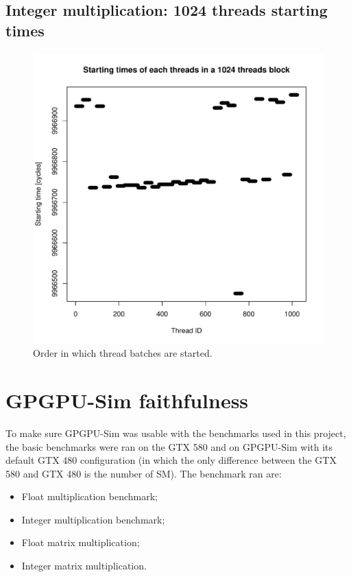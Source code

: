 \documentclass{report}
\def \scalingfactor{.8}
\begin{document}
    \section{Integer multiplication: 1024 threads starting times}
    \begin{figure}[H]
    		\centering
	    	\includegraphics[width=\scalingfactor\linewidth]{"graphics/starting_times_ratio31"}
	    	\vspace{-15pt}
	    	\captionsetup{justification=centering}    
	    	\caption{Order in which thread batches are started.}
    \end{figure}

\chapter{GPGPU-Sim faithfulness}
    To make sure GPGPU-Sim was usable with the benchmarks used in this project, the basic benchmarks were
    ran on the GTX 580 and on GPGPU-Sim with its default GTX 480 configuration (in which the only difference
    between the GTX 580 and GTX 480 is the number of SM). The benchmark ran are:
    \begin{itemize}
        \item Float multiplication benchmark;
        \item Integer multiplication benchmark;
        \item Float matrix multiplication; 
        \item Integer matrix multiplication.
    \end{itemize}
\end{document}

